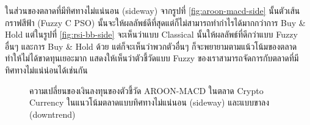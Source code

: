 ในส่วนของตลาดที่มีทิศทางไม่แน่นอน (sideway) จากรูปที่ \ref{fig:aroon-macd-side} นั้นตัวเส้นกราฟสีฟ้า (Fuzzy C PSO) นั้นจะให้ผลลัพธ์ดีที่สุดแต่ก็ไม่สามารถทำกำไรได้มากกว่าการ Buy \& Hold แต่ในรูปที่ \ref{fig:rsi-bb-side} จะเห็นว่าแบบ Classical นั้นให้ผลลัพธ์ที่ดีกว่าแบบ Fuzzy อื่นๆ และการ Buy \& Hold ด้วย แต่ก็จะเห็นว่าพวกตัวอื่นๆ ก็จะพยายามตามแน้วโน้มของตลาดทำให้ไม่ได้ขาดทุนเยอะมาก แสดงให้เห็นว่าตัวชี้วัดแบบ Fuzzy ของเราสามารถจัดการกับตลาดที่มีทิศทางไม่แน่น่อนได้เช่นกัน

\begin{figure}[!ht]
    \centering
    \label{fig:aroon-macd-down}
    \caption{ความเปลี่ยนของเงินลงทุนของตัวชี้วัด AROON-MACD ในตลาด Crypto Currency ในแนวโน้มตลาดแบบทิศทางไม่แน่นอน (sideway) และแบบขาลง (downtrend)}
\end{figure}

